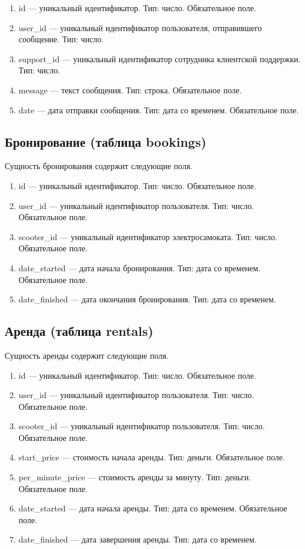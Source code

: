 \begin{enumerate}
    \item id --- уникальный идентификатор. Тип: число. Обязательное поле.
    \item user\_id --- уникальный идентификатор пользователя, отправившего сообщение. Тип: число.
    \item support\_id --- уникальный идентификатор сотрудника клиентской поддержки. Тип: число.
    \item message --- текст сообщения. Тип: строка. Обязательное поле.
    \item date --- дата отправки сообщения. Тип: дата со временем. Обязательное поле.
\end{enumerate}

\subsection{Бронирование (таблица bookings)}

Сущность бронирования содержит следующие поля.

\begin{enumerate}
    \item id --- уникальный идентификатор. Тип: число. Обязательное поле.
    \item user\_id --- уникальный идентификатор пользователя. Тип: число. Обязательное поле.
    \item scooter\_id --- уникальный идентификатор электросамоката. Тип: число. Обязательное поле.
    \item date\_started --- дата начала бронирования. Тип: дата со временем. Обязательное поле.
    \item date\_finished --- дата окончания бронирования. Тип: дата со временем.
\end{enumerate}

\subsection{Аренда (таблица rentals)}

Сущность аренды содержит следующие поля.

\begin{enumerate}
    \item id --- уникальный идентификатор. Тип: число. Обязательное поле.
    \item user\_id --- уникальный идентификатор пользователя. Тип: число. Обязательное поле.
    \item scooter\_id --- уникальный идентификатор пользователя. Тип: число. Обязательное поле.
    \item start\_price --- стоимость начала аренды. Тип: деньги. Обязательное поле.
    \item per\_minute\_price --- стоимость аренды за минуту. Тип: деньги. Обязательное поле.
    \item date\_started --- дата начала аренды. Тип: дата со временем. Обязательное поле.
    \item date\_finished --- дата завершения аренды. Тип: дата со временем.
\end{enumerate}

